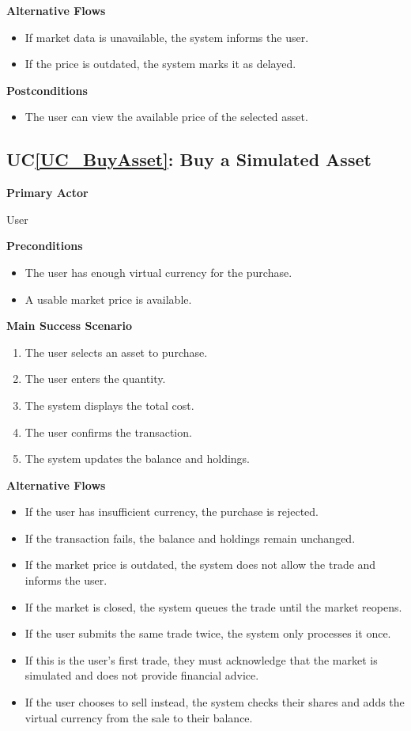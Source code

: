 \documentclass[12pt]{article}
\newcounter{ucnum} %
\newcommand{\ucref}[1]{UC\ref{#1}}
\begin{document}
\textbf{Alternative Flows}
\begin{itemize}
\item If market data is unavailable, the system informs the user.
\item If the price is outdated, the system marks it as delayed.
\end{itemize}

\textbf{Postconditions}
\begin{itemize}
\item The user can view the available price of the selected asset.
\end{itemize}


\label{UC_BuyAsset}
\subsection{\ucref{UC_BuyAsset}: Buy a Simulated Asset}

\textbf{Primary Actor}

User

\textbf{Preconditions}
\begin{itemize}
\item The user has enough virtual currency for the purchase.
\item A usable market price is available.
\end{itemize}

\textbf{Main Success Scenario}
\begin{enumerate}
\item The user selects an asset to purchase.
\item The user enters the quantity.
\item The system displays the total cost.
\item The user confirms the transaction.
\item The system updates the balance and holdings.
\end{enumerate}

\textbf{Alternative Flows}
\begin{itemize}
\item If the user has insufficient currency, the purchase is rejected.
\item If the transaction fails, the balance and holdings remain unchanged.
\item If the market price is outdated, the system does not allow the trade and informs the user.
\item If the market is closed, the system queues the trade until the market reopens.
\item If the user submits the same trade twice, the system only processes it once.
\item If this is the user's first trade, they must acknowledge that the market is simulated and does not provide financial advice.
\item If the user chooses to sell instead, the system checks their shares and adds the virtual currency from the sale to their balance.
\end{itemize}
\end{document}
